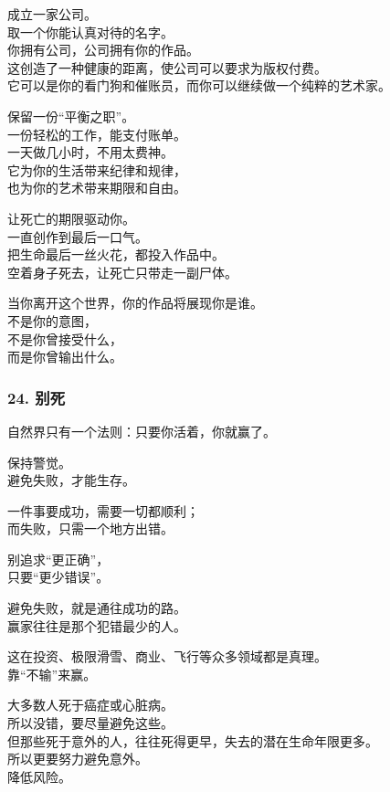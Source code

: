 \documentclass[
]{article}
\begin{document}
成立一家公司。\\
取一个你能认真对待的名字。\\
你拥有公司，公司拥有你的作品。\\
这创造了一种健康的距离，使公司可以要求为版权付费。\\
它可以是你的看门狗和催账员，而你可以继续做一个纯粹的艺术家。

保留一份``平衡之职''。\\
一份轻松的工作，能支付账单。\\
一天做几小时，不用太费神。\\
它为你的生活带来纪律和规律，\\
也为你的艺术带来期限和自由。

让死亡的期限驱动你。\\
一直创作到最后一口气。\\
把生命最后一丝火花，都投入作品中。\\
空着身子死去，让死亡只带走一副尸体。

当你离开这个世界，你的作品将展现你是谁。\\
不是你的意图，\\
不是你曾接受什么，\\
而是你曾输出什么。

\subsubsection{24. 别死}\label{24-ux522bux6b7b}

自然界只有一个法则：只要你活着，你就赢了。

保持警觉。\\
避免失败，才能生存。

一件事要成功，需要一切都顺利；\\
而失败，只需一个地方出错。

别追求``更正确''，\\
只要``更少错误''。

避免失败，就是通往成功的路。\\
赢家往往是那个犯错最少的人。

这在投资、极限滑雪、商业、飞行等众多领域都是真理。\\
靠``不输''来赢。

大多数人死于癌症或心脏病。\\
所以没错，要尽量避免这些。\\
但那些死于意外的人，往往死得更早，失去的潜在生命年限更多。\\
所以更要努力避免意外。\\
降低风险。
\end{document}
